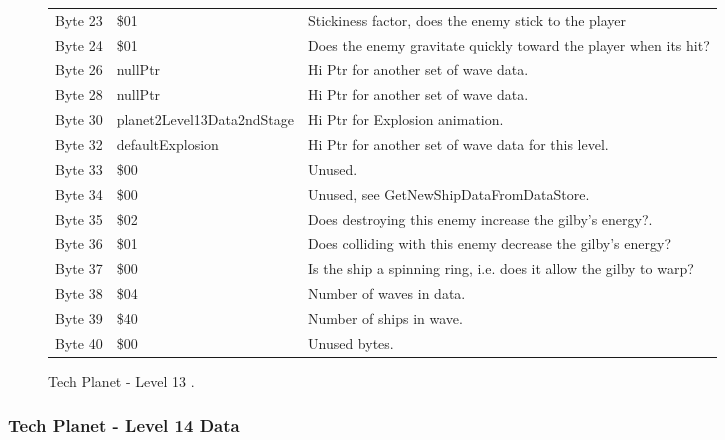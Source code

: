 \begin{figure}[H]
{\begin{adjustbox}{width=12cm}
\begin{tabular}{lll}
 Byte 23 & \$01                        & Stickiness factor, does the enemy stick to the player              \\
 Byte 24 & \$01                        & Does the enemy gravitate quickly toward the player when its hit?   \\
 Byte 26 & nullPtr                    & Hi Ptr for another set of wave data.                               \\
 Byte 28 & nullPtr                    & Hi Ptr for another set of wave data.                               \\
 Byte 30 & planet2Level13Data2ndStage & Hi Ptr for Explosion animation.                                    \\
 Byte 32 & defaultExplosion           & Hi Ptr for another set of wave data for this level.                \\
 Byte 33 & \$00                        & Unused.                                                            \\
 Byte 34 & \$00                        & Unused, see GetNewShipDataFromDataStore.                           \\
 Byte 35 & \$02                        & Does destroying this enemy increase the gilby's energy?.           \\
 Byte 36 & \$01                        & Does colliding with this enemy decrease the gilby's energy?        \\
 Byte 37 & \$00                        & Is the ship a spinning ring, i.e. does it allow the gilby to warp? \\
 Byte 38 & \$04                        & Number of waves in data.                                           \\
 Byte 39 & \$40                        & Number of ships in wave.                                           \\
 Byte 40 & \$00                        & Unused bytes.                                                      \\
\bottomrule
\end{tabular}

  \end{adjustbox}

  }\caption*{Tech Planet - Level 13
.}
\end{figure}

\clearpage
\subsubsection{Tech Planet - Level 14 Data}

